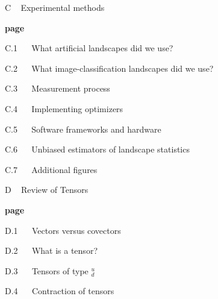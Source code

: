 \documentclass[anon,12pt]{colt2021} %
\begin{document}
{        {\bf
        \par\noindent C ~ Experimental methods}                                 \hfill {\bf page \pageref{appendix:experiments}}
        \par\indent     C.1 ~~ What artificial landscapes did we use?           \hfill \pageref{appendix:artificial}  
        \par\indent     C.2 ~~ What image-classification landscapes did we use? \hfill \pageref{appendix:natural}
        \par\indent     C.3 ~~ Measurement process                              \hfill \pageref{appendix:measure}
        \par\indent     C.4 ~~ Implementing optimizers                          \hfill \pageref{appendix:optimizers}
        \par\indent     C.5 ~~ Software frameworks and hardware                 \hfill \pageref{appendix:frameworks}
        \par\indent     C.6 ~~ Unbiased estimators of landscape statistics      \hfill \pageref{appendix:bessel}
        \par\indent     C.7 ~~ Additional figures                               \hfill \pageref{appendix:figures}

        {\bf
        \par\noindent D ~ Review of Tensors}                                    \hfill {\bf page \pageref{appendix:tensors}}
        \par\indent     D.1 ~~ Vectors versus covectors                         \hfill \pageref{appendix:tensor-variance}
        \par\indent     D.2 ~~ What is a tensor?                                \hfill \pageref{appendix:what-tensor}  
        \par\indent     D.3 ~~ Tensors of type $^u_d$                           \hfill \pageref{appendix:what-tensor}  
        \par\indent     D.4 ~~ Contraction of tensors                           \hfill \pageref{appendix:tensor-contraction}

\newpage
}
\end{document}
